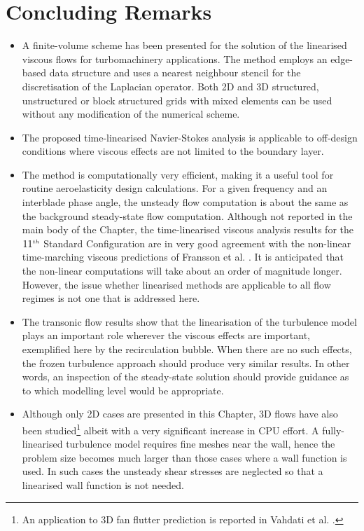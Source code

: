 \section{Concluding Remarks}
%
\begin{itemize}
%
\item
 A finite-volume scheme  has been presented for the solution of the linearised
 viscous flows for turbomachinery applications.
 The method employs an edge-based
 data structure and uses a nearest neighbour stencil for the discretisation of
 the Laplacian operator. Both 2D and 3D
 structured, unstructured or block structured grids with mixed elements 
 can be used without any modification of the numerical scheme. 
%
\item
 The proposed time-linearised Navier-Stokes analysis is applicable
 to off-design conditions  where viscous effects are not limited to the boundary layer.
%
\item
 The method is computationally very efficient, making it a useful tool for routine 
 aeroelasticity design calculations. For a given frequency and an interblade phase
 angle, the unsteady flow computation is about the same as the
 background steady-state flow computation.
 Although not reported in the main body of the Chapter, the time-linearised
 viscous analysis results for the $11^{\mbox{\tiny $th$}}$ Standard Configuration
 are in very good agreement with the non-linear time-marching viscous predictions
 of Fransson et al. \citeyear{Bolcs:2}.
 It is anticipated that the non-linear computations will take about an order
 of magnitude longer. However, the issue whether linearised methods are applicable
 to all flow regimes is not one that is addressed here.
%
\item
 The  transonic flow results show that the linearisation of the turbulence model
 plays an important role wherever the viscous effects are important, exemplified
 here by the recirculation bubble. When there are no such effects, 
 the frozen turbulence approach should produce very similar results. In other words, 
 an inspection of the steady-state solution should provide guidance as to which
 modelling level would be appropriate.
%
\item
 Although only 2D cases are presented in this Chapter,
 3D flows have also been studied\footnote{An application to 3D fan flutter prediction
 is reported in Vahdati et al. \citeyear{Luca:12}.}
 albeit with a very significant increase in CPU effort.
 A fully-linearised turbulence model requires fine meshes near the wall,
 hence the problem size becomes much larger than those cases where a wall
 function is used. In such cases the unsteady shear stresses are neglected 
 so that a linearised wall function is not needed.
%
\end{itemize}
%
%
